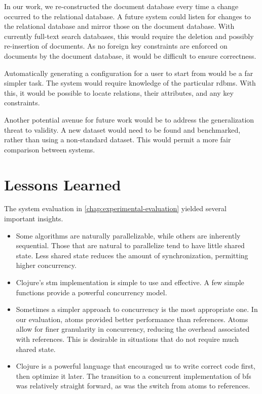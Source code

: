 		In our work, we re-constructed the document database every time a change occurred to the relational database.  A future system could listen for changes to the relational database and mirror those on the document database.  With currently full-text search databases, this would require the deletion and possibly re-insertion of documents.  As no foreign key constraints are enforced on documents by the document database, it would be difficult to ensure correctness.
		
		Automatically generating a configuration for a user to start from would be a far simpler task.  The system would require knowledge of the particular \gls{rdbms}.  With this, it would be possible to locate relations, their attributes, and any key constraints.
		
		Another potential avenue for future work would be to address the generalization threat to validity.  A new dataset would need to be found and benchmarked, rather than using a non-standard dataset.  This would permit a more fair comparison between systems.
		
	\section{Lessons Learned}
		The system evaluation in \cref{chap:experimental-evaluation} yielded several important insights.
		
		\begin{itemize}
			\item Some algorithms are naturally parallelizable, while others are inherently sequential.  Those that are natural to parallelize tend to have little shared state.  Less shared state reduces the amount of synchronization, permitting higher concurrency.
			\item Clojure's \gls{stm} implementation is simple to use and effective.  A few simple functions provide a powerful concurrency model.
			\item Sometimes a simpler approach to concurrency is the most appropriate one.  In our evaluation, atoms provided better performance than references.  Atoms allow for finer granularity in concurrency, reducing the overhead associated with references.  This is desirable in situations that do not require much shared state.
			\item Clojure is a powerful language that encouraged us to write correct code first, then optimize it later.  The transition to a concurrent implementation of \gls{bfs} was relatively straight forward, as was the switch from atoms to references.
		\end{itemize}